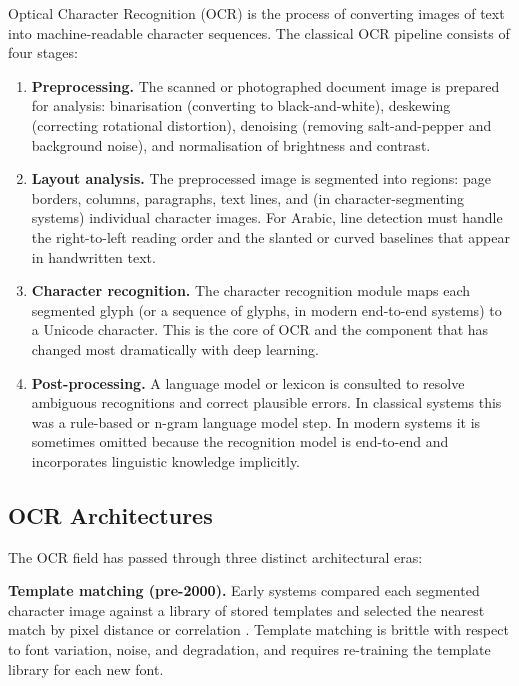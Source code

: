 Optical Character Recognition (OCR) is the process of converting images of
text into machine-readable character sequences.
The classical OCR pipeline consists of four stages:

\begin{enumerate}
  \item \textbf{Preprocessing.}
        The scanned or photographed document image is prepared for analysis:
        binarisation (converting to black-and-white), deskewing (correcting
        rotational distortion), denoising (removing salt-and-pepper and
        background noise), and normalisation of brightness and contrast.

  \item \textbf{Layout analysis.}
        The preprocessed image is segmented into regions: page borders, columns,
        paragraphs, text lines, and (in character-segmenting systems) individual
        character images.
        For Arabic, line detection must handle the right-to-left reading order
        and the slanted or curved baselines that appear in handwritten text.

  \item \textbf{Character recognition.}
        The character recognition module maps each segmented glyph (or a sequence
        of glyphs, in modern end-to-end systems) to a Unicode character.
        This is the core of OCR and the component that has changed most
        dramatically with deep learning.

  \item \textbf{Post-processing.}
        A language model or lexicon is consulted to resolve ambiguous recognitions
        and correct plausible errors.
        In classical systems this was a rule-based or n-gram language model step.
        In modern systems it is sometimes omitted because the recognition model
        is end-to-end and incorporates linguistic knowledge implicitly.
\end{enumerate}

\subsection{OCR Architectures}
\label{subsec:ocr_arch}

The OCR field has passed through three distinct architectural eras:

\textbf{Template matching (pre-2000).}
Early systems compared each segmented character image against a library of
stored templates and selected the nearest match by pixel distance or correlation
\cite{mori1992historical}.
Template matching is brittle with respect to font variation, noise, and
degradation, and requires re-training the template library for each new font.

